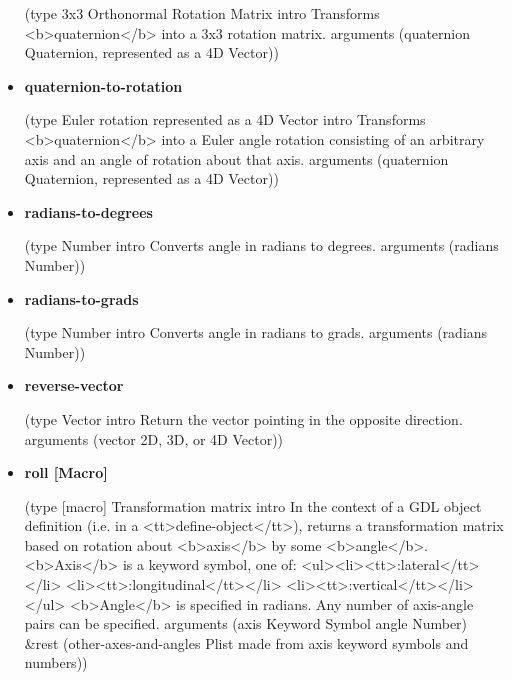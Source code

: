\documentclass [11pt]{book}
\begin{document}
\begin{itemize}
(type 3x3 Orthonormal Rotation Matrix intro
  Transforms <b>quaternion</b> into a 3x3 rotation matrix.
 arguments (quaternion Quaternion, represented as a 4D Vector))



\item {}
\label{prim:quaternion-to-rotation}
\textbf{quaternion-to-rotation}

(type Euler rotation represented as a 4D Vector intro
  Transforms <b>quaternion</b> into a
Euler angle rotation consisting of an arbitrary axis and an angle of rotation about
that axis.
 arguments (quaternion Quaternion, represented as a 4D Vector))



\item {}
\label{prim:radians-to-degrees}
\textbf{radians-to-degrees}

(type Number intro  Converts angle in radians to degrees.
 arguments (radians Number))



\item {}
\label{prim:radians-to-grads}
\textbf{radians-to-grads}

(type Number intro  Converts angle in radians to grads.
 arguments (radians Number))



\item {}
\label{prim:reverse-vector}
\textbf{reverse-vector}

(type Vector intro
  Return the vector pointing in the opposite direction.
 arguments (vector 2D, 3D, or 4D Vector))



\item {}
\label{prim:roll}
\textbf{roll [Macro]}

(type [macro] Transformation matrix intro
  In the context of a GDL object
definition (i.e. in a <tt>define-object</tt>), returns a transformation
matrix based on rotation about <b>axis</b> by some <b>angle</b>.
<b>Axis</b> is a keyword symbol, one of:
<ul><li><tt>:lateral</tt></li>
<li><tt>:longitudinal</tt></li>
<li><tt>:vertical</tt></li></ul>
<b>Angle</b> is specified in radians. Any number of axis-angle
pairs can be specified.
 arguments (axis Keyword Symbol angle Number) \&rest
 (other-axes-and-angles
  Plist made from axis keyword symbols and numbers))




\end{itemize}
\end{document}
